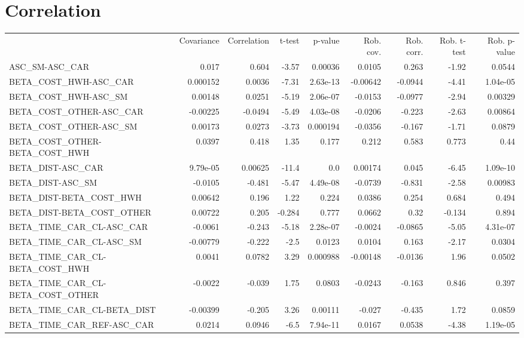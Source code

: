 \section{Correlation}
\begin{tabular}{lrrrrrrrr}
 & Covariance & Correlation & t-test & p-value & Rob. cov. & Rob. corr. & Rob. t-test & Rob. p-value \\
ASC_SM-ASC_CAR & 0.017 & 0.604 & -3.57 & 0.00036 & 0.0105 & 0.263 & -1.92 & 0.0544 \\
BETA_COST_HWH-ASC_CAR & 0.000152 & 0.0036 & -7.31 & 2.63e-13 & -0.00642 & -0.0944 & -4.41 & 1.04e-05 \\
BETA_COST_HWH-ASC_SM & 0.00148 & 0.0251 & -5.19 & 2.06e-07 & -0.0153 & -0.0977 & -2.94 & 0.00329 \\
BETA_COST_OTHER-ASC_CAR & -0.00225 & -0.0494 & -5.49 & 4.03e-08 & -0.0206 & -0.223 & -2.63 & 0.00864 \\
BETA_COST_OTHER-ASC_SM & 0.00173 & 0.0273 & -3.73 & 0.000194 & -0.0356 & -0.167 & -1.71 & 0.0879 \\
BETA_COST_OTHER-BETA_COST_HWH & 0.0397 & 0.418 & 1.35 & 0.177 & 0.212 & 0.583 & 0.773 & 0.44 \\
BETA_DIST-ASC_CAR & 9.79e-05 & 0.00625 & -11.4 & 0.0 & 0.00174 & 0.045 & -6.45 & 1.09e-10 \\
BETA_DIST-ASC_SM & -0.0105 & -0.481 & -5.47 & 4.49e-08 & -0.0739 & -0.831 & -2.58 & 0.00983 \\
BETA_DIST-BETA_COST_HWH & 0.00642 & 0.196 & 1.22 & 0.224 & 0.0386 & 0.254 & 0.684 & 0.494 \\
BETA_DIST-BETA_COST_OTHER & 0.00722 & 0.205 & -0.284 & 0.777 & 0.0662 & 0.32 & -0.134 & 0.894 \\
BETA_TIME_CAR_CL-ASC_CAR & -0.0061 & -0.243 & -5.18 & 2.28e-07 & -0.0024 & -0.0865 & -5.05 & 4.31e-07 \\
BETA_TIME_CAR_CL-ASC_SM & -0.00779 & -0.222 & -2.5 & 0.0123 & 0.0104 & 0.163 & -2.17 & 0.0304 \\
BETA_TIME_CAR_CL-BETA_COST_HWH & 0.0041 & 0.0782 & 3.29 & 0.000988 & -0.00148 & -0.0136 & 1.96 & 0.0502 \\
BETA_TIME_CAR_CL-BETA_COST_OTHER & -0.0022 & -0.039 & 1.75 & 0.0803 & -0.0243 & -0.163 & 0.846 & 0.397 \\
BETA_TIME_CAR_CL-BETA_DIST & -0.00399 & -0.205 & 3.26 & 0.00111 & -0.027 & -0.435 & 1.72 & 0.0859 \\
BETA_TIME_CAR_REF-ASC_CAR & 0.0214 & 0.0946 & -6.5 & 7.94e-11 & 0.0167 & 0.0538 & -4.38 & 1.19e-05 \\

\end{tabular}
